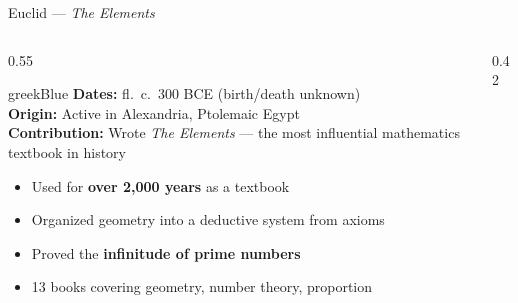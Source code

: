 \begin{frame}[shrink=4]{Euclid --- \emph{The Elements}}

  \begin{columns}[T]
    \begin{column}{0.55\textwidth}
      \begin{personbox}{greekBlue}
        \small
        \textbf{Dates:} fl.\ c.\ 300 BCE (birth/death unknown)\\
        \textbf{Origin:} Active in Alexandria, Ptolemaic Egypt\\
        \textbf{Contribution:} Wrote \emph{The Elements} --- the most influential
        mathematics textbook in history
      \end{personbox}

      \vspace{0.4em}
      \begin{itemize}
        \item Used for \textbf{over 2,000 years} as a textbook
        \item Organized geometry into a \alert{deductive system from axioms}
        \item Proved the \textbf{infinitude of prime numbers}
        \item 13 books covering geometry, number theory, proportion
      \end{itemize}
    \end{column}

    \begin{column}{0.42\textwidth}

      \vspace{0.3em}
    \end{column}
  \end{columns}

\end{frame}

